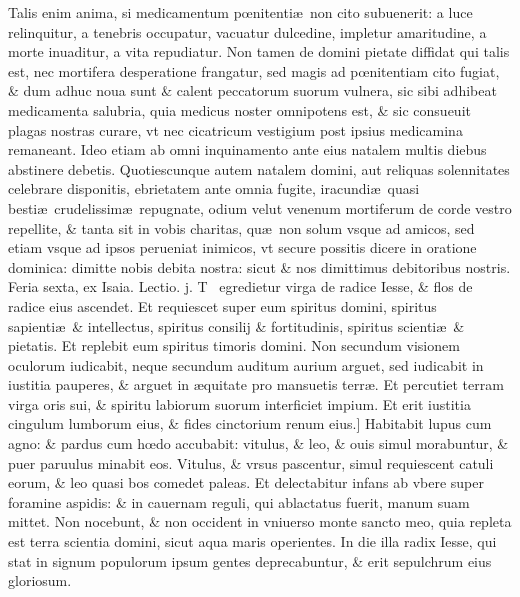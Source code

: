 \documentclass[a5paper,10pt]{book}
\def\rightmarginnote{%
	\lrmarginnote{\hskip\columnwidth \hskip -1em}}
\def\ae{æ}
\def\oe{œ}
\begin{document}
\begin{multicols*}{2}
Talis enim anima, si medicamentum p\oe nitenti\ae \ non cito subuenerit: a luce relinquitur, a tenebris occupatur, vacuatur dulcedine, impletur amaritudine, a morte inuaditur, a vita repudiatur.
Non tamen de domini pietate diffidat qui talis est, nec mortifera desperatione frangatur, sed magis ad p\oe nitentiam cito fugiat, \& dum adhuc noua sunt \& calent peccatorum suorum vulnera, sic sibi adhibeat medicamenta salubria, quia medicus noster omnipotens est, \& sic consueuit plagas nostras curare, vt nec cicatricum vestigium post ipsius medicamina remaneant.
Ideo etiam ab omni inquinamento ante eius natalem multis diebus abstinere debetis.
\newline Quotiescunque autem natalem domini, aut reliquas solennitates
celebrare disponitis, ebrietatem ante omnia fugite, iracundi\ae \ quasi besti\ae \ crudelissim\ae \ repugnate, odium velut venenum mortiferum de corde vestro repellite, \& tanta sit in vobis charitas, qu\ae \ non solum vsque ad amicos, sed etiam vsque ad ipsos perueniat inimicos, vt secure possitis dicere in oratione dominica: dimitte nobis debita nostra: sicut \& nos dimittimus debitoribus nostris.
\newline {} \color{red} \hypertarget{FRI-PRIMA-ADV}{Feria sexta,} ex Isaia. \hfill Lectio. j. \color{black}
\vspace{-.5em}
T \textdagger \ egredietur\rightmarginnote{c. 11.\\a} virga de radice Iesse, \& flos de radice eius ascendet.
Et requiescet super eum spiritus domini, spiritus sapienti\ae \ \& intellectus, spiritus consilij \& fortitudinis, spiritus scienti\ae \ \& pietatis. Et replebit eum spiritus timoris domini.
Non secundum visionem oculorum iudicabit, neque secundum auditum aurium arguet, sed iudicabit in iustitia pauperes, \& arguet in \ae quitate pro mansuetis terr\ae .
Et percutiet terram virga oris sui, \& spiritu labiorum suorum interficiet impium. Et erit iustitia cingulum lumborum eius, \& fides cinctorium renum eius.]
Habitabit\rightmarginnote{B} lupus cum agno: \& pardus cum h\oe do accubabit: vitulus, \& leo, \& ouis simul morabuntur, \& puer paruulus minabit eos.
Vitulus, \& vrsus pascentur, simul requiescent catuli eorum, \& leo quasi bos comedet paleas.
Et delectabitur infans ab vbere super foramine aspidis: \& in cauernam reguli, qui ablactatus fuerit, manum suam mittet.
Non nocebunt, \& non occident in vniuerso monte sancto meo, quia repleta est terra scientia domini, sicut aqua maris operientes.
In die illa radix Iesse, qui stat in signum populorum ipsum gentes deprecabuntur, \& erit sepulchrum eius gloriosum.

\end{multicols*}
\end{document}
